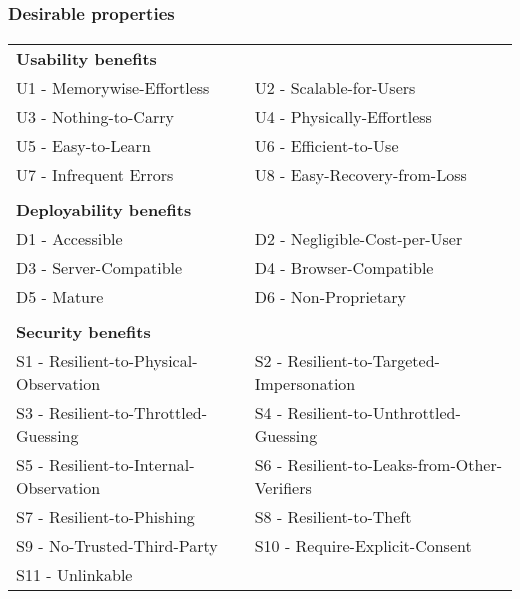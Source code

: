 \documentclass[handout, notes=hide]{beamer}
\begin{document}
\begin{frame}
\frametitle{Desirable properties}
\framesubtitle{}
\setlength{\parskip}{0.5em}
\scriptsize
\begin{tabular}{l l}
{\bf Usability benefits} & \\
U1 - Memorywise-Effortless & U2 - Scalable-for-Users \\
U3 - Nothing-to-Carry & U4 - Physically-Effortless \\
U5 - Easy-to-Learn & U6 - Efficient-to-Use \\
U7 - Infrequent Errors & U8 - Easy-Recovery-from-Loss \\
& \\
{\bf Deployability benefits} & \\
D1 - Accessible & D2 - Negligible-Cost-per-User \\
D3 - Server-Compatible & D4 - Browser-Compatible \\
D5 - Mature & D6 - Non-Proprietary \\
& \\
{\bf Security benefits} & \\
S1 - Resilient-to-Physical-Observation & S2 - Resilient-to-Targeted-Impersonation  \\
S3 - Resilient-to-Throttled-Guessing & S4 - Resilient-to-Unthrottled-Guessing \\
S5 - Resilient-to-Internal-Observation & S6 - Resilient-to-Leaks-from-Other-Verifiers \\
S7 - Resilient-to-Phishing & S8 - Resilient-to-Theft \\
S9 - No-Trusted-Third-Party & S10 - Require-Explicit-Consent \\
S11 - Unlinkable & \\
\end{tabular}
\end{frame}

\end{document}
